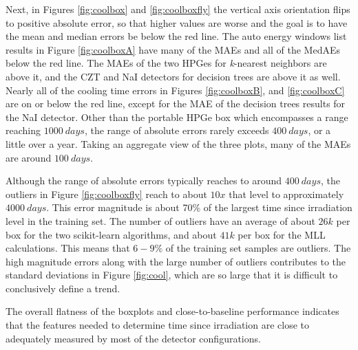 Next, in Figures \ref{fig:coolbox} and \ref{fig:coolboxfly} the vertical axis
orientation flips to positive absolute error, so that higher values are worse
and the goal is to have the mean and median errors be below the red line.  The
auto energy windows list results in Figure \ref{fig:coolboxA} have many of the
\gls{MAE}s and all of the \gls{MedAE}s below the red line.  The \gls{MAE}s of
the two \gls{HPGe}s for \textit{k}-nearest neighbors are above it, and the
\gls{CZT} and \gls{NaI} detectors for decision trees are above it as well.
Nearly all of the cooling time errors in Figures \ref{fig:coolboxB}, and
\ref{fig:coolboxC} are on or below the red line, except for the \gls{MAE} of
the decision trees results for the \gls{NaI} detector.  Other than the portable
\gls{HPGe} box which encompasses a range reaching $1000\:days$, the range of
absolute errors rarely exceeds $400\:days$, or a little over a year.  Taking an
aggregate view of the three plots, many of the \gls{MAE}s are around
$100\:days$.

Although the range of absolute errors typically reaches to around $400\:days$,
the outliers in Figure \ref{fig:coolboxfly} reach to about $10x$ that level to
approximately $4000\:days$. This error magnitude is about 70\% of the largest
time since irradiation level in the training set.  The number of outliers have
an average of about $26k$ per box for the two scikit-learn algorithms, and
about $41k$ per box for the \gls{MLL} calculations.  This means that $6-9\%$ of
the training set samples are outliers.  The high magnitude errors along with
the large number of outliers contributes to the standard deviations in Figure
\ref{fig:cool}, which are so large that it is difficult to conclusively define
a trend.

The overall flatness of the boxplots and close-to-baseline performance
indicates that the features needed to determine time since irradiation are
close to adequately measured by most of the detector configurations.

